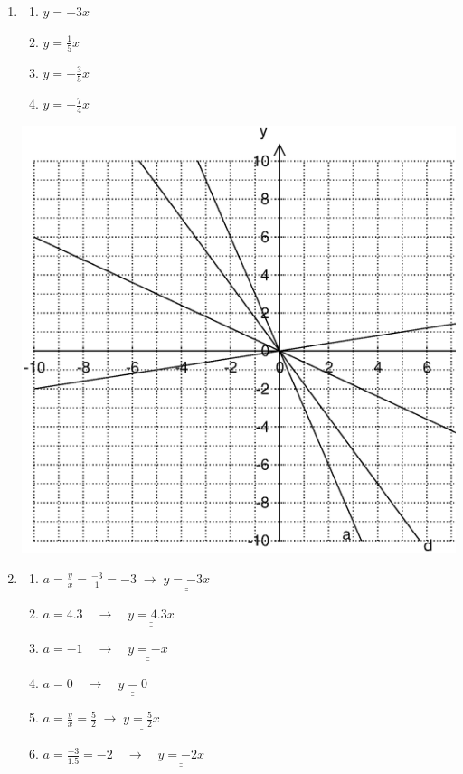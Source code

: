 \documentclass[%
11pt,%
twoside,%
titlepage,%
german,%
headsepline%
]{scrartcl}
\newcommand{\result}[1]{\underline{\underline{#1}}}
\begin{document}
{{\begin{enumerate}
\item
  \begin{enumerate}
  \item $\displaystyle y=-3x$
  \item $\displaystyle y=\frac{1}{5}x$
  \item $\displaystyle y=-\frac{3}{5}x$
  \item $\displaystyle y=-\frac{7}{4}x$
  \end{enumerate}

\begin{center}
\includegraphics[width=0.9\linewidth]{pictures/geraden2.eps}
\end{center}

\item
  \begin{enumerate}
  \item $\displaystyle a=\frac{y}{x}=\frac{-3}{1}=-3 \;\rightarrow\; \result{y=-3x}$
  \item $\displaystyle a=4.3 \quad\rightarrow\quad \result{y=4.3x}$
  \item $\displaystyle a=-1 \quad\rightarrow\quad \result{y=-x}$
  \item $\displaystyle a=0 \quad\rightarrow\quad \result{y=0}$
  \item $\displaystyle a=\frac{y}{x}=\frac{5}{2} \;\rightarrow\; \result{y=\frac{5}{2}x}$
  \item $\displaystyle a=\frac{-3}{1.5}=-2 \quad\rightarrow\quad \result{y=-2x}$
  \end{enumerate}


\end{enumerate}}}
\end{document}
